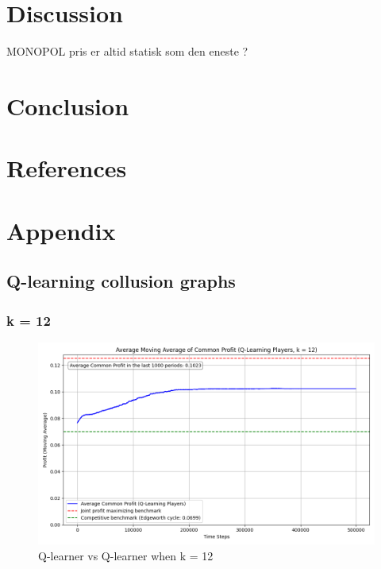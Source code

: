 \documentclass{article}
\begin{document}
\section{Discussion}
MONOPOL pris er altid statisk som den eneste ?

\section{Conclusion}

\newpage 


\section{References}





\section{Appendix}
\subsection{Q-learning collusion graphs}

\subsubsection{k = 12}
\begin{figure}[H]
    \centering
    \includegraphics[scale = 0.45]{K=12.png}
    \caption{Q-learner vs Q-learner when k = 12}
    \label{fig: QlearnervQlearnerK=12}
\end{figure}
\end{document}
